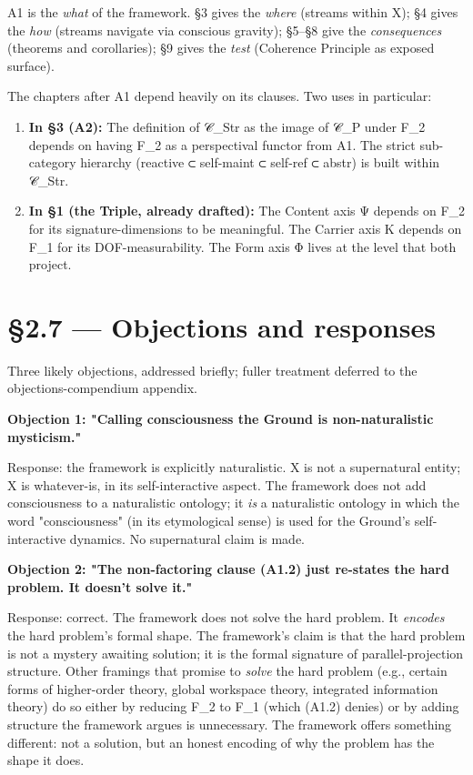 \documentclass[11pt, openany]{book}
\newcommand{\sectionbreak}{\clearpage}
\begin{document}
A1 is the \textit{what} of the framework. §3 gives the \textit{where} (streams within X); §4 gives the \textit{how} (streams navigate via conscious gravity); §5–§8 give the \textit{consequences} (theorems and corollaries); §9 gives the \textit{test} (Coherence Principle as exposed surface).

The chapters after A1 depend heavily on its clauses. Two uses in particular:

\begin{enumerate}
\item \textbf{In §3 (A2):} The definition of 𝒞\_\allowbreak{}Str as the image of 𝒞\_\allowbreak{}P under F\_\allowbreak{}2 depends on having F\_\allowbreak{}2 as a perspectival functor from A1. The strict sub-category hierarchy (reactive ⊂ self-maint ⊂ self-ref ⊂ abstr) is built within 𝒞\_\allowbreak{}Str.
\item \textbf{In §1 (the Triple, already drafted):} The Content axis Ψ depends on F\_\allowbreak{}2 for its signature-dimensions to be meaningful. The Carrier axis K depends on F\_\allowbreak{}1 for its DOF-measurability. The Form axis Φ lives at the level that both project.
\end{enumerate}

\sectionbreak

\section{§2.7 --- Objections and responses}

Three likely objections, addressed briefly; fuller treatment deferred to the objections-compendium appendix.

\textbf{Objection 1: "Calling consciousness the Ground is non-naturalistic mysticism."}

Response: the framework is explicitly naturalistic. X is not a supernatural entity; X is whatever-is, in its self-interactive aspect. The framework does not add consciousness to a naturalistic ontology; it \textit{is} a naturalistic ontology in which the word "consciousness" (in its etymological sense) is used for the Ground's self-interactive dynamics. No supernatural claim is made.

\textbf{Objection 2: "The non-factoring clause (A1.2) just re-states the hard problem. It doesn't solve it."}

Response: correct. The framework does not solve the hard problem. It \textit{encodes} the hard problem's formal shape. The framework's claim is that the hard problem is not a mystery awaiting solution; it is the formal signature of parallel-projection structure. Other framings that promise to \textit{solve} the hard problem (e.g., certain forms of higher-order theory, global workspace theory, integrated information theory) do so either by reducing F\_\allowbreak{}2 to F\_\allowbreak{}1 (which (A1.2) denies) or by adding structure the framework argues is unnecessary. The framework offers something different: not a solution, but an honest encoding of why the problem has the shape it does.
\end{document}
